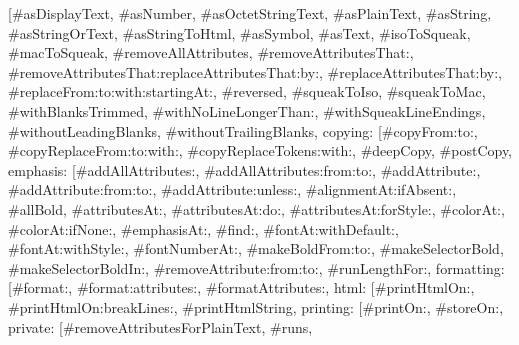 {{[}\textquotedbl{}\#asDisplayText\textquotedbl{}, \textquotedbl{}\#asNumber\textquotedbl{}, \textquotedbl{}\#asOctetStringText\textquotedbl{}, \textquotedbl{}\#asPlainText\textquotedbl{}, \textquotedbl{}\#asString\textquotedbl{}, \textquotedbl{}\#asStringOrText\textquotedbl{}, \textquotedbl{}\#asStringToHtml\textquotedbl{}, \textquotedbl{}\#asSymbol\textquotedbl{}, \textquotedbl{}\#asText\textquotedbl{}, \textquotedbl{}\#isoToSqueak\textquotedbl{}, \textquotedbl{}\#macToSqueak\textquotedbl{}, \textquotedbl{}\#removeAllAttributes\textquotedbl{}, \textquotedbl{}\#removeAttributesThat:\textquotedbl{}, \textquotedbl{}\#removeAttributesThat:replaceAttributesThat:by:\textquotedbl{}, \textquotedbl{}\#replaceAttributesThat:by:\textquotedbl{}, \textquotedbl{}\#replaceFrom:to:with:startingAt:\textquotedbl{}, \textquotedbl{}\#reversed\textquotedbl{}, \textquotedbl{}\#squeakToIso\textquotedbl{}, \textquotedbl{}\#squeakToMac\textquotedbl{}, \textquotedbl{}\#withBlanksTrimmed\textquotedbl{}, \textquotedbl{}\#withNoLineLongerThan:\textquotedbl{}, \textquotedbl{}\#withSqueakLineEndings\textquotedbl{}, \textquotedbl{}\#withoutLeadingBlanks\textquotedbl{}, \textquotedbl{}\#withoutTrailingBlanks\textquotedbl{}{]}, \textquotedbl{}copying\textquotedbl{}: {[}\textquotedbl{}\#copyFrom:to:\textquotedbl{}, \textquotedbl{}\#copyReplaceFrom:to:with:\textquotedbl{}, \textquotedbl{}\#copyReplaceTokens:with:\textquotedbl{}, \textquotedbl{}\#deepCopy\textquotedbl{}, \textquotedbl{}\#postCopy\textquotedbl{}{]}, \textquotedbl{}emphasis\textquotedbl{}: {[}\textquotedbl{}\#addAllAttributes:\textquotedbl{}, \textquotedbl{}\#addAllAttributes:from:to:\textquotedbl{}, \textquotedbl{}\#addAttribute:\textquotedbl{}, \textquotedbl{}\#addAttribute:from:to:\textquotedbl{}, \textquotedbl{}\#addAttribute:unless:\textquotedbl{}, \textquotedbl{}\#alignmentAt:ifAbsent:\textquotedbl{}, \textquotedbl{}\#allBold\textquotedbl{}, \textquotedbl{}\#attributesAt:\textquotedbl{}, \textquotedbl{}\#attributesAt:do:\textquotedbl{}, \textquotedbl{}\#attributesAt:forStyle:\textquotedbl{}, \textquotedbl{}\#colorAt:\textquotedbl{}, \textquotedbl{}\#colorAt:ifNone:\textquotedbl{}, \textquotedbl{}\#emphasisAt:\textquotedbl{}, \textquotedbl{}\#find:\textquotedbl{}, \textquotedbl{}\#fontAt:withDefault:\textquotedbl{}, \textquotedbl{}\#fontAt:withStyle:\textquotedbl{}, \textquotedbl{}\#fontNumberAt:\textquotedbl{}, \textquotedbl{}\#makeBoldFrom:to:\textquotedbl{}, \textquotedbl{}\#makeSelectorBold\textquotedbl{}, \textquotedbl{}\#makeSelectorBoldIn:\textquotedbl{}, \textquotedbl{}\#removeAttribute:from:to:\textquotedbl{}, \textquotedbl{}\#runLengthFor:\textquotedbl{}{]}, \textquotedbl{}formatting\textquotedbl{}: {[}\textquotedbl{}\#format:\textquotedbl{}, \textquotedbl{}\#format:attributes:\textquotedbl{}, \textquotedbl{}\#formatAttributes:\textquotedbl{}{]}, \textquotedbl{}html\textquotedbl{}: {[}\textquotedbl{}\#printHtmlOn:\textquotedbl{}, \textquotedbl{}\#printHtmlOn:breakLines:\textquotedbl{}, \textquotedbl{}\#printHtmlString\textquotedbl{}{]}, \textquotedbl{}printing\textquotedbl{}: {[}\textquotedbl{}\#printOn:\textquotedbl{}, \textquotedbl{}\#storeOn:\textquotedbl{}{]}, \textquotedbl{}private\textquotedbl{}: {[}\textquotedbl{}\#removeAttributesForPlainText\textquotedbl{}, \textquotedbl{}\#runs\textquotedbl{}, }
